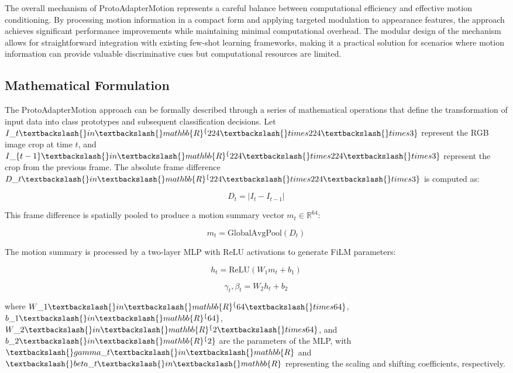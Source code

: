 \documentclass[11pt]{article}
\begin{document}
The overall mechanism of ProtoAdapterMotion represents a careful balance between computational efficiency and effective motion conditioning. By processing motion information in a compact form and applying targeted modulation to appearance features, the approach achieves significant performance improvements while maintaining minimal computational overhead. The modular design of the mechanism allows for straightforward integration with existing few-shot learning frameworks, making it a practical solution for scenarios where motion information can provide valuable discriminative cues but computational resources are limited.

\subsection{Mathematical Formulation}

The ProtoAdapterMotion approach can be formally described through a series of mathematical operations that define the transformation of input data into class prototypes and subsequent classification decisions. Let $I\_t \textbackslash\{\}in \textbackslash\{\}mathbb\{R\}^\{224 \textbackslash\{\}times 224 \textbackslash\{\}times 3\}$ represent the RGB image crop at time $t$, and $I\_\{t-1\} \textbackslash\{\}in \textbackslash\{\}mathbb\{R\}^\{224 \textbackslash\{\}times 224 \textbackslash\{\}times 3\}$ represent the crop from the previous frame. The absolute frame difference $D\_t \textbackslash\{\}in \textbackslash\{\}mathbb\{R\}^\{224 \textbackslash\{\}times 224 \textbackslash\{\}times 3\}$ is computed as:

$$D_t = |I_t - I_{t-1}|$$

This frame difference is spatially pooled to produce a motion summary vector $m_t \in \mathbb{R}^{64}$:

$$m_t = \text{GlobalAvgPool}(D_t)$$

The motion summary is processed by a two-layer MLP with ReLU activations to generate FiLM parameters:

$$h_t = \text{ReLU}(W_1 m_t + b_1)$$

$$\gamma_t, \beta_t = W_2 h_t + b_2$$

where $W\_1 \textbackslash\{\}in \textbackslash\{\}mathbb\{R\}^\{64 \textbackslash\{\}times 64\}$, $b\_1 \textbackslash\{\}in \textbackslash\{\}mathbb\{R\}^\{64\}$, $W\_2 \textbackslash\{\}in \textbackslash\{\}mathbb\{R\}^\{2 \textbackslash\{\}times 64\}$, and $b\_2 \textbackslash\{\}in \textbackslash\{\}mathbb\{R\}^\{2\}$ are the parameters of the MLP, with $\textbackslash\{\}gamma\_t \textbackslash\{\}in \textbackslash\{\}mathbb\{R\}$ and $\textbackslash\{\}beta\_t \textbackslash\{\}in \textbackslash\{\}mathbb\{R\}$ representing the scaling and shifting coefficients, respectively.
\end{document}
